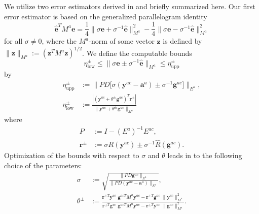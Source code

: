 \documentclass[11pt,reqno,oneside]{amsart}
\numberwithin{equation}{section}
\begin{document}
We utilize two error estimators derived in
\cite{ArndtLuskin:2007a} and briefly summarized here.
Our first error estimator is based on the generalized parallelogram identity
\begin{equation}\label{EqParallelogram}
  \hat{{\mathbf{e}}}^T M^a {\mathbf{e}}
= \textstyle \frac{1}{4} \| \sigma{\mathbf{e}} + \sigma^{-1}\hat{{\mathbf{e}}} \|_{M^a}^2
               - \frac{1}{4} \| \sigma{\mathbf{e}} - \sigma^{-1}\hat{{\mathbf{e}}} \|_{M^a}^2
\end{equation}
for all $\sigma\ne0$, where the $M^a$-norm of some vector ${\mathbf{z}}$ is defined by
$\|{\mathbf{z}}\|_{M^a} := ({\mathbf{z}}^T M^a {\mathbf{z}})^{1/2}$.  We define the computable
bounds
\begin{equation}\label{eta}
  \eta_\text{low}^\pm \le \| \sigma{\mathbf{e}} \pm \sigma^{-1}\hat{{\mathbf{e}}} \|_{M^a} \le \eta_\text{upp}^\pm
\end{equation}
by
\begin{equation}
\begin{aligned}
  \eta_\text{upp}^\pm
  & := \big\| P D \big[ \sigma ( {\mathbf{y}}^{ac} - {\mathbf{a}}^a )
       \pm \sigma^{-1} {\mathbf{g}}^{ac} \big] \big\|_{E^a}, \\
  \eta_\text{low}^\pm
  & := \frac{\left| ({\mathbf{y}}^{ac} + \theta^\pm {\mathbf{g}}^{ac})^T {\mathbf{r}}^\pm \right|}
       {\| {\mathbf{y}}^{ac} + \theta^\pm {\mathbf{g}}^{ac} \|_{M^a}}
\end{aligned}
\end{equation}
where
\begin{equation}
\begin{aligned}
  P          & := I - (E^a)^{-1} E^{ac}, \\
  {\mathbf{r}}^\pm & := \sigma R({\mathbf{y}}^{ac}) \pm \sigma^{-1} \hat R({\mathbf{g}}^{ac}).
\end{aligned}
\end{equation}
Optimization of the bounds with respect to $\sigma$ and $\theta$ leads
in \cite{ArndtLuskin:2007a} to the following choice of the
parameters:
\begin{equation}
\begin{split}
  \sigma & := \sqrt{\frac{\| P D {\mathbf{g}}^{ac} \|_{E^a}}
       {\| P D ( {\mathbf{y}}^{ac} - {\mathbf{a}}^a ) \|_{E^a}}}, \\
  \theta^\pm & :=
    \frac{ {\mathbf{r}}^{\pm T} {\mathbf{y}}^{ac} \; {\mathbf{g}}^{acT} M^a {\mathbf{y}}^{ac} -
           {\mathbf{r}}^{\pm T} {\mathbf{g}}^{ac} \; \|{\mathbf{y}}^{ac}\|_{M^a}^2}
         { {\mathbf{r}}^{\pm T} {\mathbf{g}}^{ac} \; {\mathbf{g}}^{acT} M^a {\mathbf{y}}^{ac} -
           {\mathbf{r}}^{\pm T} {\mathbf{y}}^{ac} \; \|{\mathbf{g}}^{ac}\|_{M^a}^2}.
\end{split}
\end{equation}
\end{document}

